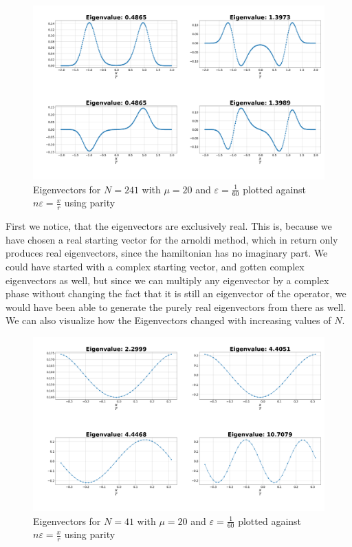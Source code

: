 \documentclass[11pt, letterpaper, onecolumn]{article}
\begin{document}
 	\begin{figure} [H] 
	\begin{center}
	\includegraphics[width=15cm]{"eigenvectors_Parity.png"}
	\caption{Eigenvectors for $N=241$ with $\mu=20$ and $\varepsilon=\frac{1}{60}$ plotted against $n\varepsilon=\frac{x}{r}$ using parity}
	\end{center}
	\end{figure}
 	First we notice, that the eigenvectors are exclusively real. This is, because we have chosen a real starting vector for the arnoldi method, which in return only produces real eigenvectors, since the hamiltonian has no imaginary part. We could have started with a complex starting vector, and gotten complex eigenvectors as well, but since we can multiply any eigenvector by a complex phase without changing the fact that it is still an eigenvector of the operator, we would have been able to generate the purely real eigenvectors from there as well.\\
  	We can also visualize how the Eigenvectors changed with increasing values of $N$.
   	\begin{figure} [H] 
	\begin{center}
	\includegraphics[width=15cm]{"inf_vol_lim_N41.png"}
	\caption{Eigenvectors for $N=41$ with $\mu=20$ and $\varepsilon=\frac{1}{60}$ plotted against $n\varepsilon=\frac{x}{r}$ using parity}
	\end{center}
	\end{figure}
 	
\end{document}
